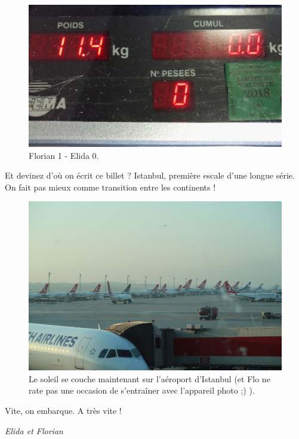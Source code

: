 \begin{figure}
\centering
\includegraphics{images/20180503_Florian_sac.jpg}
\caption{Florian 1 - Elida 0.}
\end{figure}

Et devinez d'où on écrit ce billet ? Istanbul, première escale d'une
longue série. On fait pas mieux comme transition entre les continents !

\begin{figure}
\centering
\includegraphics{images/20180503_Escale_Istanbul.JPG}
\caption{Le soleil se couche maintenant sur l'aéroport d'Istanbul (et
Flo ne rate pas une occasion de s'entraîner avec l'appareil photo ;) ).}
\end{figure}

Vite, on embarque. A très vite !

\emph{Elida et Florian}
